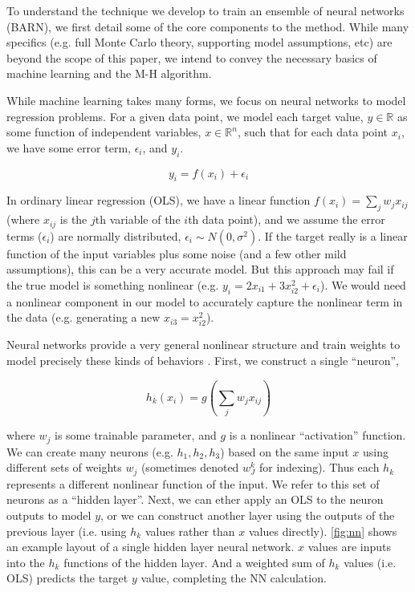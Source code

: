 \documentclass[12pt]{article}
\begin{document}

To understand the technique we develop to train an ensemble of neural networks (BARN), we first detail some of the core components to the method.  While many specifics (e.g. full Monte Carlo theory, supporting model assumptions, etc) are beyond the scope of this paper, we intend to convey the necessary basics of machine learning and the M-H algorithm.

While machine learning takes many forms, we focus on neural networks to model regression problems.  For a given data point, we model each target value, $y \in \mathbb{R}$ as some function of independent variables, $x \in \mathbb{R}^n$, such that for each data point $x_i$, we have some error term, $\epsilon_i$, and $y_i$.

$$
y_i = f(x_i) + \epsilon_i
$$

In ordinary linear regression (OLS), we have a linear function $f(x_i) = \sum_j w_j x_{ij}$ (where $x_{ij}$ is the $j$th variable of the $i$th data point), and we assume the error terms ($\epsilon_i$) are normally distributed, $\epsilon_i \sim N(0,\sigma^2)$.  If the target really is a linear function of the input variables plus some noise (and a few other mild assumptions), this can be a very accurate model.  But this approach may fail if the true model is something nonlinear (e.g. $y_i = 2x_{i1} + 3x_{i2}^2 + \epsilon_i$).  We would need a nonlinear component in our model to accurately capture the nonlinear term in the data (e.g. generating a new $x_{i3} =x_{i2}^2$).

Neural networks provide a very general nonlinear structure and train weights to model precisely these kinds of behaviors \cite{hastie2009elements}.  First, we construct a single ``neuron'',

$$
h_k(x_i) = g(\sum_j w_j x_{ij})
$$

where $w_j$ is some trainable parameter, and $g$ is a nonlinear ``activation'' function.  We can create many neurons (e.g. $h_1, h_2, h_3$) based on the same input $x$ using different sets of weights $w_j$ (sometimes denoted $w_J^k$ for indexing).  Thus each $h_k$ represents a different nonlinear function of the input.  We refer to this set of neurons as a ``hidden layer''.  Next, we can ether apply an OLS to the neuron outputs to model $y$, or we can construct another layer using the outputs of the previous layer (i.e. using $h_k$ values rather than $x$ values directly).  \autoref{fig:nn} shows an example layout of a single hidden layer neural network.  $x$ values are inputs into the $h_k$ functions of the hidden layer.  And a weighted sum of $h_k$ values  (i.e. OLS) predicts the target $y$ value, completing the NN calculation.
\end{document}
